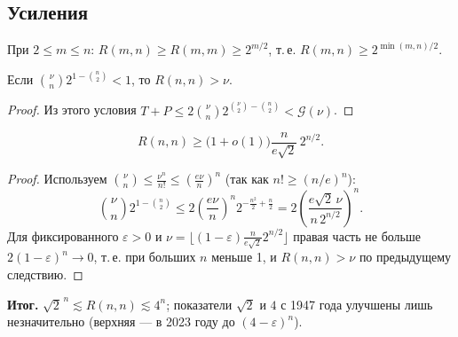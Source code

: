 \subsection*{Усиления}
\begin{cor}
При \(2\le m\le n\): \(R(m,n)\ge R(m,m)\ge2^{m/2}\), т.\,е. \(R(m,n)\ge2^{\min(m,n)/2}\).
\end{cor}
\begin{cor}
Если \(\binom{\nu}{n}2^{1-\binom n2}<1\), то \(R(n,n)>\nu\).
\end{cor}
\begin{proof}
Из этого условия \(T+P\le2\binom\nu n2^{\binom\nu2-\binom n2}<\mathcal G(\nu)\).
\end{proof}
\begin{cor}
\[
R(n,n)\ge\bigl(1+o(1)\bigr)\frac{n}{e\sqrt2}\,2^{n/2}.
\]
\end{cor}
\begin{proof}
Используем \(\binom\nu n\le\frac{\nu^n}{n!}\le\left(\frac{e\nu}{n}\right)^n\) (так как \(n!\ge(n/e)^n\)):
\[
\binom{\nu}{n}2^{1-\binom n2}\le2\left(\frac{e\nu}{n}\right)^n2^{-\frac{n^2}{2}+\frac n2}
=2\left(\frac{e\sqrt2\,\nu}{n\,2^{n/2}}\right)^n .
\]
Для фиксированного \(\varepsilon>0\) и \(\nu=\bigl\lfloor(1-\varepsilon)\frac{n}{e\sqrt2}2^{n/2}\bigr\rfloor\)
правая часть не больше \(2(1-\varepsilon)^n\to0\), т.\,е. при больших \(n\) меньше 1, и
\(R(n,n)>\nu\) по предыдущему следствию.
\end{proof}
\textbf{Итог.} \(\sqrt2^{\,n}\lesssim R(n,n)\lesssim4^n\); показатели \(\sqrt2\) и \(4\) с 1947 года
улучшены лишь незначительно (верхняя — в 2023 году до \((4-\varepsilon)^n\)).
